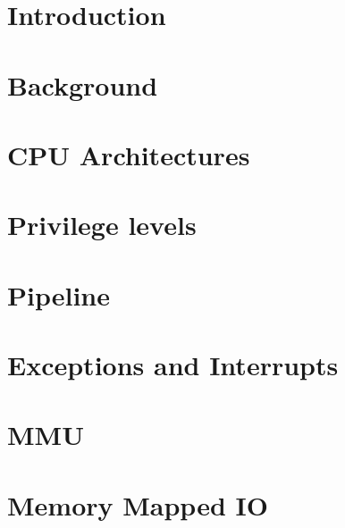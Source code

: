 \documentclass[11pt, twocolumn]{article}
\begin{document}
\newpage

\twocolumn

\tableofcontents

\onecolumn
\newpage
\twocolumn

\clearpage
{}
\setcounter{page}{1}

\noindent


\section{Introduction}


\section{Background}


\section{CPU Architectures}



\section{Privilege levels}


\section{Pipeline}


\section{Exceptions and Interrupts}


\section{MMU}


\section{Memory Mapped IO}

\end{document}
